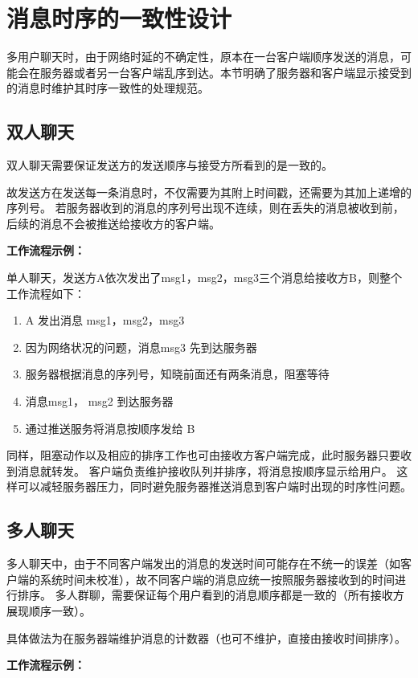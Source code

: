 {\color{red}
\section{消息时序的一致性设计}
多用户聊天时，由于网络时延的不确定性，原本在一台客户端顺序发送的消息，可能会在服务器或者另一台客户端乱序到达。本节明确了服务器和客户端显示接受到的消息时维护其时序一致性的处理规范。\\


\subsection{双人聊天}
双人聊天需要保证发送方的发送顺序与接受方所看到的是一致的。

故发送方在发送每一条消息时，不仅需要为其附上时间戳，还需要为其加上递增的序列号。
若服务器收到的消息的序列号出现不连续，则在丢失的消息被收到前，后续的消息不会被推送给接收方的客户端。

\textbf{工作流程示例：}

单人聊天，发送方A依次发出了msg1，msg2，msg3三个消息给接收方B，则整个工作流程如下：
\begin{enumerate}
	\item A 发出消息 msg1，msg2，msg3
	\item 因为网络状况的问题，消息msg3 先到达服务器
	\item 服务器根据消息的序列号，知晓前面还有两条消息，阻塞等待
	\item 消息msg1， msg2 到达服务器
	\item 通过推送服务将消息按顺序发给 B
\end{enumerate}

同样，阻塞动作以及相应的排序工作也可由接收方客户端完成，此时服务器只要收到消息就转发。
客户端负责维护接收队列并排序，将消息按顺序显示给用户。
这样可以减轻服务器压力，同时避免服务器推送消息到客户端时出现的时序性问题。

\subsection{多人聊天}
多人聊天中，由于不同客户端发出的消息的发送时间可能存在不统一的误差（如客户端的系统时间未校准），故不同客户端的消息应统一按照服务器接收到的时间进行排序。
多人群聊，需要保证每个用户看到的消息顺序都是一致的（所有接收方展现顺序一致）。

具体做法为在服务器端维护消息的计数器（也可不维护，直接由接收时间排序）。

\textbf{工作流程示例：}

}
